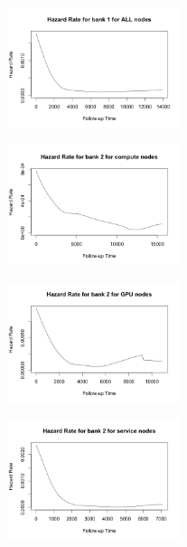\begin{figure}
\centering
\includegraphics[width=0.45\textwidth]{images/haz_1_a.png}
\end{figure}

\begin{figure}
\centering
\includegraphics[width=0.45\textwidth]{images/haz_2_c.png}
\end{figure}

\begin{figure}
\centering
\includegraphics[width=0.45\textwidth]{images/haz_2_g.png}
\end{figure}

\begin{figure}
\centering
\includegraphics[width=0.45\textwidth]{images/haz_2_s.png}
\end{figure}

